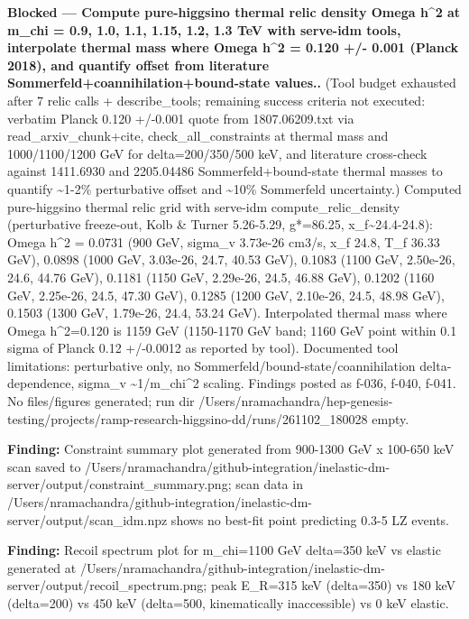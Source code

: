 \documentclass[11pt,a4paper]{article}
\begin{document}
\textbf{Blocked --- Compute pure-higgsino thermal relic density Omega h\textasciicircum{}2 at m\_chi = 0.9, 1.0, 1.1, 1.15, 1.2, 1.3 TeV with serve-idm tools, interpolate thermal mass where Omega h\textasciicircum{}2 = 0.120 +/- 0.001 (Planck 2018), and quantify offset from literature Sommerfeld+coannihilation+bound-state values..} (Tool budget exhausted after 7 relic calls + describe\_tools; remaining success criteria not executed: verbatim Planck 0.120 +/-0.001 quote from 1807.06209.txt via read\_arxiv\_chunk+cite, check\_all\_constraints at thermal mass and 1000/1100/1200 GeV for delta=200/350/500 keV, and literature cross-check against 1411.6930 and 2205.04486 Sommerfeld+bound-state thermal masses to quantify \textasciitilde{}1-2\% perturbative offset and \textasciitilde{}10\% Sommerfeld uncertainty.) Computed pure-higgsino thermal relic grid with serve-idm compute\_relic\_density (perturbative freeze-out, Kolb \& Turner 5.26-5.29, g*=86.25, x\_f\textasciitilde{}24.4-24.8): Omega h\textasciicircum{}2 = 0.0731 (900 GeV, sigma\_v 3.73e-26 cm3/s, x\_f 24.8, T\_f 36.33 GeV), 0.0898 (1000 GeV, 3.03e-26, 24.7, 40.53 GeV), 0.1083 (1100 GeV, 2.50e-26, 24.6, 44.76 GeV), 0.1181 (1150 GeV, 2.29e-26, 24.5, 46.88 GeV), 0.1202 (1160 GeV, 2.25e-26, 24.5, 47.30 GeV), 0.1285 (1200 GeV, 2.10e-26, 24.5, 48.98 GeV), 0.1503 (1300 GeV, 1.79e-26, 24.4, 53.24 GeV). Interpolated thermal mass where Omega h\textasciicircum{}2=0.120 is 1159 GeV (1150-1170 GeV band; 1160 GeV point within 0.1 sigma of Planck 0.12 +/-0.0012 as reported by tool). Documented tool limitations: perturbative only, no Sommerfeld/bound-state/coannihilation delta-dependence, sigma\_v \textasciitilde{}1/m\_chi\textasciicircum{}2 scaling. Findings posted as f-036, f-040, f-041. No files/figures generated; run dir /Users/nramachandra/hep-genesis-testing/projects/ramp-research-higgsino-dd/runs/261102\_180028 empty.

\textbf{Finding:} Constraint summary plot generated from 900-1300 GeV x 100-650 keV scan saved to /Users/nramachandra/github-integration/inelastic-dm-server/output/constraint\_summary.png; scan data in /Users/nramachandra/github-integration/inelastic-dm-server/output/scan\_idm.npz shows no best-fit point predicting 0.3-5 LZ events.

\textbf{Finding:} Recoil spectrum plot for m\_chi=1100 GeV delta=350 keV vs elastic generated at /Users/nramachandra/github-integration/inelastic-dm-server/output/recoil\_spectrum.png; peak E\_R=315 keV (delta=350) vs 180 keV (delta=200) vs 450 keV (delta=500, kinematically inaccessible) vs 0 keV elastic.
\end{document}
